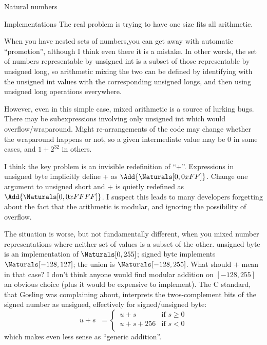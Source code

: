 \documentclass[12pt]{PalisadesLakesBook}
\begin{document}
\begin{plSection}{Natural numbers}
\begin{plSection}{Implementations}
The real problem is trying to have one size fits all arithmetic.

When you have nested sets of numbers,you can get away with
automatic ``promotion'', 
although I think even there it is a mistake.
In other words, the set of numbers representable by
{\javaFont unsigned int} is a subset of those
representable by {\javaFont unsigned long},
so arithmetic mixing the two can be defined by identifying
with the {\javaFont unsigned int} values 
with the corresponding {\javaFont unsigned long}s,
and then using {\javaFont unsigned long} operations everywhere.

However, even in this simple case, mixed arithmetic is 
a source of lurking bugs.
There may be subexpressions involving only 
{\javaFont unsigned int} which would overflow/wraparound.
Might re-arrangements of the code may change whether the
wraparound happens or not, so a given intermediate value
may be $0$ in some cases, and $1+2^{32}$ in others.

I think the key problem is an invisible redefinition of 
``{\javaFont +}''.
Expressions in {\javaFont unsigned byte} implicitly define
{\javaFont +} as $\Add{\Naturals[0,0xFF]}$.
Change one argument to {\javaFont unsigned short} 
and {\javaFont +} is quietly redefined as
$\Add{\Naturals[0,0xFFFF]}$.
I suspect this leads to many developers forgetting about the
fact that the arithmetic is modular, and ignoring the possibility
of overflow.

The situation is worse, but not fundamentally different,
when you mixed number representations where neither set of
values is a subset of the other.
{\javaFont unsigned byte} is an implementation of
$\Naturals[0,255]$;
{\javaFont signed byte} implements $\Naturals[-128,127]$;
the union is $\Naturals[-128,255]$.
What should $+$ mean in that case?
I don't think anyone would find modular addition
on $[-128,255]$ an obvious choice (plus it would be expensive to 
implement).
The C standard, that Gosling was complaining about,
interprets the twos-complement bits of the signed number
as unsigned, effectively for signed/unsigned byte:
\begin{equation}
u + s \; \;=
\begin{cases}
\, u + s & \text{if } s \geq 0 \\
\, u + s + 256 & \text{if } s < 0 \\
\end{cases}
\end{equation}
which makes even less sense as ``generic addition''.


\end{plSection}
\end{plSection}
\end{document}
